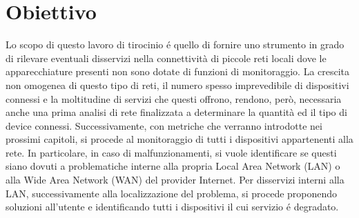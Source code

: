 









\section{Obiettivo}

Lo scopo di questo lavoro di tirocinio \'e quello di fornire uno strumento in grado di rilevare eventuali disservizi nella connettivit\`a di piccole reti locali dove le apparecchiature presenti non sono dotate di funzioni di monitoraggio.
La crescita non omogenea di questo tipo di reti, il numero spesso imprevedibile di dispositivi connessi e la moltitudine di servizi che questi offrono, rendono, per\`o, necessaria anche una prima analisi di rete finalizzata a determinare la quantit\`a ed il tipo di device connessi.
Successivamente, con metriche che verranno introdotte nei prossimi capitoli, si procede al monitoraggio di tutti i dispositivi appartenenti alla rete. 
In particolare, in caso di malfunzionamenti, si vuole identificare se questi siano dovuti a problematiche interne alla propria Local Area Network (LAN) o alla Wide Area Network (WAN) del provider Internet.
Per disservizi interni alla LAN, successivamente alla localizzazione del problema, si procede proponendo soluzioni all'utente e identificando tutti i dispositivi il cui servizio \'e degradato.


